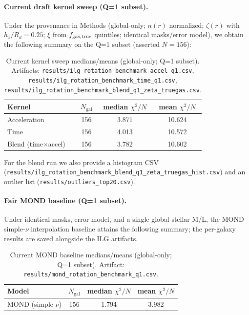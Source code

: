 \documentclass[fleqn,usenatbib]{mnras}
\begin{document}
\paragraph{Current draft kernel sweep (Q=1 subset).} Under the provenance in Methods (global-only; $n(r)$ normalized; $\zeta(r)$ with $h_z/R_d=0.25$; $\xi$ from $f_{\rm gas,true}$ quintiles; identical masks/error model), we obtain the following summary on the Q=1 subset (asserted $N=156$):
\begin{table}[h]
\centering
\caption{Current kernel sweep medians/means (global-only; Q=1 subset). Artifacts: \texttt{results/ilg\_rotation\_benchmark\_accel\_q1.csv}, \texttt{results/ilg\_rotation\_benchmark\_time\_q1.csv}, \texttt{results/ilg\_rotation\_benchmark\_blend\_q1\_zeta\_truegas.csv}.}
\label{tab:kernel_sweep_current}
\begin{tabular}{l c c c}
\toprule
Kernel & $N_\mathrm{gal}$ & median $\chi^2/N$ & mean $\chi^2/N$ \\
\midrule
Acceleration & 156 & 3.871 & 10.624 \\
Time         & 156 & 4.013 & 10.572 \\
Blend (time$\times$accel) & 156 & 3.782 & 10.602 \\
\bottomrule
\end{tabular}
\end{table}
For the blend run we also provide a histogram CSV (\texttt{results/ilg\_rotation\_benchmark\_blend\_q1\_zeta\_truegas\_hist.csv}) and an outlier list (\texttt{results/outliers\_top20.csv}).

\paragraph{Fair MOND baseline (Q=1 subset).} Under identical masks, error model, and a single global stellar M/L, the MOND simple-$\nu$ interpolation baseline attains the following summary; the per-galaxy results are saved alongside the ILG artifacts.
\begin{table}[h]
\centering
\caption{Current MOND baseline medians/means (global-only; Q=1 subset). Artifact: \texttt{results/mond\_rotation\_benchmark\_q1.csv}.}
\label{tab:mond_baseline_current}
\begin{tabular}{l c c c}
\toprule
Model & $N_\mathrm{gal}$ & median $\chi^2/N$ & mean $\chi^2/N$ \\
\midrule
MOND (simple $\nu$) & 156 & 1.794 & 3.982 \\
\bottomrule
\end{tabular}
\end{table}
\end{document}
